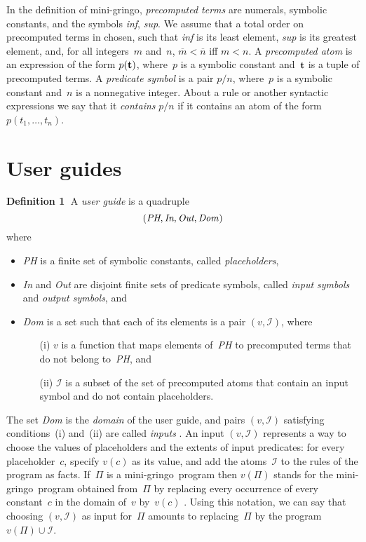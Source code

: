 \documentclass{new_tlp}
\def\beq{\begin{equation}}
\def\eeq#1{\label{#1}\end{equation}}
\def\gringo{{\sc gringo}}
\def\num{\overline}
\newcommand{\I}{\mathcal{I}}
\begin{document}
In the definition of mini-\gringo,
\emph{precomputed terms} are numerals,
  symbolic constants, and the symbols \emph{inf}, \emph{sup}.
  We assume that a total order on precomputed terms in chosen, such that
  \emph{inf} is its least element, \emph{sup} is its greatest element, and,
 for all integers~$m$ and~$n$,   $\num m < \num n$ iff $m<n$.
A  \emph{precomputed atom} is an expression of the form $p({\bf t})$, where~$p$
  is a symbolic constant and~$\bf t$ is a tuple of precomputed terms.
  A \emph{predicate symbol} is a pair $p/n$, where~$p$ is a symbolic
  constant and~$n$ is a nonnegative integer.  About a rule or another
  syntactic expressions we say that it \emph{contains} $p/n$ if it
  contains an atom of the form $p(t_1,\dots,t_n)$.

\section{User guides}\label{sec:ug}

{\bf Definition 1}$\;$
A \emph{user guide} is a quadruple
\beq
(\emph{PH},\emph{In},\emph{Out},\emph{Dom\/})
\eeq{ug}
where
\begin{itemize}
\item \emph{PH} is a finite set of symbolic constants, called
  \emph{placeholders},
\item \emph{In} and \emph{Out} are disjoint finite sets of predicate
  symbols, called \emph{input symbols} and \emph{output symbols},
  and
\item \emph{Dom} is a set such that each of its elements is a pair $(v,\I)$,
  where
  \begin{itemize}
  \item [(i)]$v$ is a function that maps elements of~\emph{PH} to
      precomputed terms that do not belong to~\emph{PH}, and
    \item  [(ii)] $\I$ is a subset of the set of precomputed atoms that contain
      an input symbol and do not contain placeholders.
\end{itemize}
\end{itemize}

The set \emph{Dom} is the \emph{domain} of the user guide, and
pairs $(v,\I)$ satisfying conditions~(i) and~(ii) are called \emph{inputs}
\cite[Section~5.2]{fan20}.
An input $(v,\I)$ represents a way to choose the values of
placeholders and the extents of input predicates: for every
placeholder~$c$, specify $v(c)$ as its value, and add the atoms~$\I$
to the rules of the program as facts.  If~$\Pi$ is a mini-\gringo\ program
then $v(\Pi)$ stands for the mini-\gringo\ program obtained from~$\Pi$ by
replacing every occurrence of every constant~$c$ in the domain of~$v$
by~$v(c)$
\cite[Section~2.4]{fan22}.  Using this notation, we can say that
choosing $(v,\I)$ as input for~$\Pi$ amounts to
replacing~$\Pi$ by the program $v(\Pi)\cup\I$.
\end{document}
